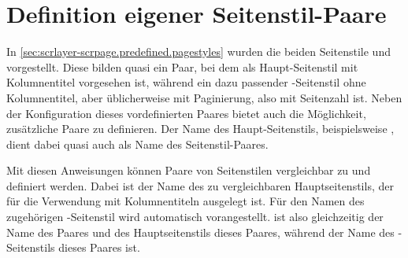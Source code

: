 
\section{Definition eigener Seitenstil-Paare}

In \autoref{sec:scrlayer-scrpage.predefined.pagestyles} wurden die beiden
Seitenstile  und 
vorgestellt. Diese bilden quasi ein Paar, bei dem  als
Haupt-Seitenstil mit Kolumnentitel vorgesehen ist, während
 ein dazu passender -Seitenstil
ohne Kolumnentitel, aber üblicherweise mit Paginierung, also mit Seitenzahl
ist. Neben der Konfiguration dieses vordefinierten Paares bietet
 auch die Möglichkeit, zusätzliche Paare zu
definieren. Der Name des Haupt-Seitenstils, beispielsweise
, dient dabei quasi auch als Name des Seitenstil-Paares.


\begin{Declaration}
\end{Declaration}
Mit diesen Anweisungen können Paare von Seitenstilen vergleichbar zu
 und  definiert
werden. Dabei ist  der Name des zu 
vergleichbaren Hauptseitenstils, der für die Verwendung mit Kolumnentiteln
ausgelegt ist. Für den Namen des zugehörigen -Seitenstil wird
 automatisch  vorangestellt.  ist also
gleichzeitig der Name des Paares und des Hauptseitenstils dieses Paares, während
 der Name des -Seitenstils dieses
Paares ist.

